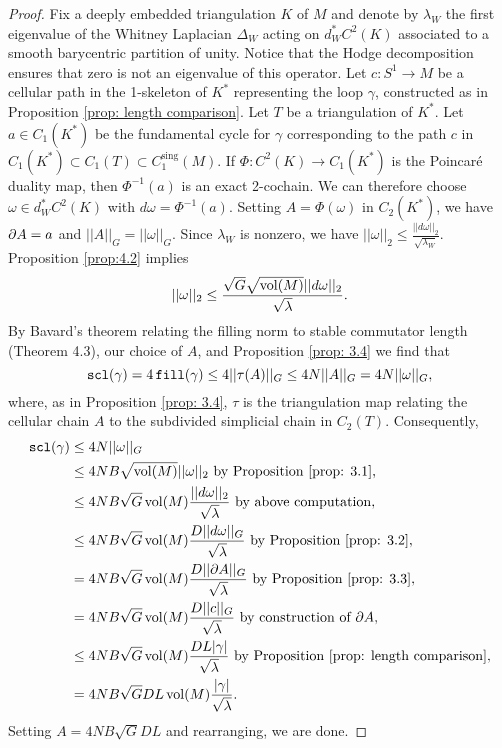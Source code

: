 \begin{proof}
Fix a deeply embedded triangulation $K$ of $M$ and denote by $\lambda_W$ the first eigenvalue of the Whitney Laplacian $\Delta_W$ acting on $d^*_WC^2(K)$ associated to a smooth barycentric partition of unity. Notice that the Hodge decomposition ensures that zero is not an eigenvalue of this operator. Let $c:S^1\to M$ be a cellular path in the 1-skeleton of $K^*$ representing the loop $\gamma$, constructed as in Proposition  \ref{prop: length comparison}.
Let $T$ be a triangulation of $K^*$. Let $a\in C_1(K^*)$ be the fundamental cycle for $\gamma$ corresponding to the path $c$ in $C_1(K^*)\subset C_1(T)\subset C_1^{\text{sing}}(M)$.
If $\Phi:C^2(K)\to C_1(K^*)$ is the Poincar\'e duality map, then $\Phi^{-1}(a)$ is an exact 2-cochain. We can therefore choose $\omega\in d^*_WC^2(K)$ with $d\omega = \Phi^{-1}(a)$. Setting $A = \Phi(\omega)$ in $C_2(K^*)$, we have $\partial A = a$ and $||A||_G = ||\omega||_G.$
Since $\lambda_W$ is nonzero, we have $||\omega||_2 \leq \frac{||d\omega||_2}{\sqrt{\lambda_W}}$.  Proposition \ref{prop:4.2} implies  \[||\omega||_2\leq \frac{\sqrt G\sqrt{\operatorname{vol}(M)} ||d\omega||_2}{\sqrt{\lambda}}.\] By Bavard’s theorem relating the filling norm to stable commutator length (Theorem 4.3), our choice of $A$, and Proposition \ref{prop: 3.4} we find that
$$\operatorname{{\tt{scl}}}(\gamma) = 4\operatorname{{\tt{fill}}}(\gamma) \leq 4||\tau(A)||_G \leq 4N||A||_G = 4N||\omega||_G,$$ where, as in Proposition \ref{prop: 3.4}, $\tau$ is the triangulation map relating the cellular chain $A$ to the subdivided simplicial chain in $C_2(T)$. Consequently,
\begin{align*}
                  \operatorname{{\tt{scl}}}(\gamma) &\leq 4N ||\omega||_G\\
                 &\leq 4NB\sqrt{\operatorname{vol}(M)}||\omega||_2 ~\text{by Proposition \ref{prop: 3.1},}\\
                 &\leq  4NB\sqrt G \operatorname{vol}(M)\frac{||d\omega||_2}{\sqrt{\lambda}} ~\text{by above computation,}\\
                 &\leq 4NB\sqrt G \operatorname{vol}(M)\frac{D||d\omega||_G}{\sqrt{\lambda}}~\text{by Proposition  \ref{prop: 3.2},} \\
                 &=4NB\sqrt G \operatorname{vol}(M)\frac{D||\partial  A||_G}{\sqrt{\lambda}}~\text{by Proposition  \ref{prop: 3.3},} \\
                 &=  4NB\sqrt G \operatorname{vol}(M)\frac{D||c||_G}{\sqrt{\lambda}} \text{ by construction of $\partial A$,} \\
                 &\leq 4NB\sqrt G \operatorname{vol}(M)\frac{DL|\gamma|}{\sqrt{\lambda}}~\text{by Proposition  \ref{prop: length comparison},} \\
                 &= 4NB\sqrt G DL\operatorname{vol}(M)\frac{|\gamma|}{\sqrt{\lambda}}.
\end{align*}
Setting $A=4NB\sqrt G DL$ and rearranging, we are done.
\end{proof}
